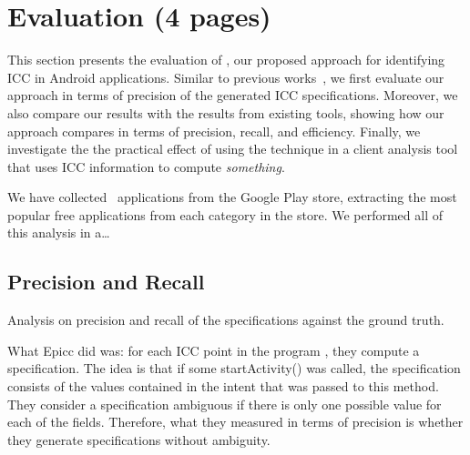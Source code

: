 \section{Evaluation (4 pages)}



This section presents the evaluation of \tname{}, our proposed approach for identifying ICC in Android applications. Similar to previous works~\cite{epicc}, we first evaluate our approach in terms of precision of the generated ICC specifications. Moreover, we also compare our results with the results from existing tools, showing how our approach compares in terms of precision, recall, and efficiency. Finally, we investigate the the practical effect of using the technique in a client analysis tool that uses ICC information to compute \emph{something}. 

We have collected \totalapps{}~applications from the Google Play store, extracting the most popular free applications from each category in the store. We performed all of this analysis in a\ldots {}

\subsection{Precision and Recall}

Analysis on precision and recall of the specifications against the ground truth.

What Epicc did was: for each ICC point in the program , they compute a specification. The
idea is that if some startActivity() was called, the specification
consists of the values contained in the intent that was passed to this
method. They consider a specification ambiguous if there is only one
possible value for each of the fields. Therefore, what they measured
in terms of precision is whether they generate specifications without
ambiguity. 

